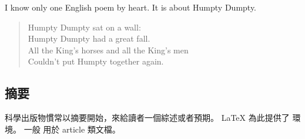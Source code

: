 \begin{example}
I know only one English poem by
heart. It is about Humpty Dumpty.
\begin{flushleft}
\begin{verse}
Humpty Dumpty sat on a wall:\\
Humpty Dumpty had a great fall.\\
All the King's horses and all
the King's men\\
Couldn't put Humpty together
again.
\end{verse}
\end{flushleft}
\end{example}

\subsection{摘要}

科學出版物慣常以摘要開始，來給讀者一個綜述或者預期。
\LaTeX{} 為此提供了  環境。
一般  用於 article 類文檔。

